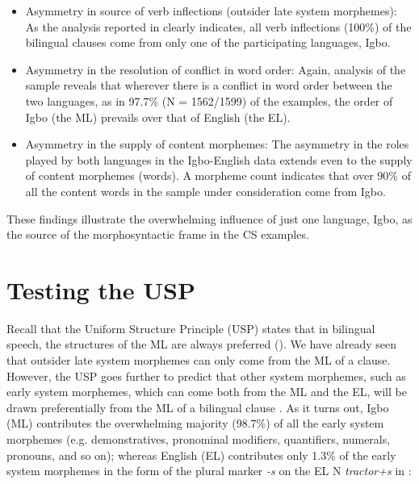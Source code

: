 \documentclass[output=paper]{langsci/langscibook}
\begin{document}
\begin{itemize}
 \item Asymmetry in source of verb inflections (outsider late system morphemes): As the analysis reported in  clearly indicates, all verb inflections (100\%) of the bilingual clauses come from only one of the participating languages, Igbo.

 \item Asymmetry in the resolution of conflict in word order: Again, analysis of the sample reveals that wherever there is a conflict in word order between the two languages, as in 97.7\% (N = 1562/1599) of the examples, the order of Igbo (the ML) prevails over that of English (the EL). 

 \item Asymmetry in the supply of content morphemes: The asymmetry in the roles played by both languages in the Igbo-English data extends even to the supply of content morphemes (words). A morpheme count indicates that over 90\% of all the content words in the sample under consideration come from Igbo.
 
\end{itemize}
 
 

These findings illustrate the overwhelming influence of just one language, Igbo, as the source of the morphosyntactic frame in the CS examples. 

\section{Testing the USP}\label{sec:ihemere:7}

Recall that the Uniform Structure Principle (USP) states that in bilingual speech, the structures of the ML are always preferred (). We have already seen that outsider late system morphemes can only come from the ML of a clause. However, the USP goes further to predict that other system morphemes, such as early system morphemes, which can come both from the ML and the EL, will be drawn preferentially from the ML of a bilingual clause \citep[8-9]{MyersScotton2002}. As it turns out, Igbo (ML) contributes the overwhelming majority (98.7\%) of all the early system morphemes (e.g. demonstratives, pronominal modifiers, quantifiers, numerals, pronouns, and so on); whereas English (EL) contributes only 1.3\% of the early system morphemes in the form of the plural marker \textit{-s} on the EL N \textit{tractor+s} in : 
\end{document}
